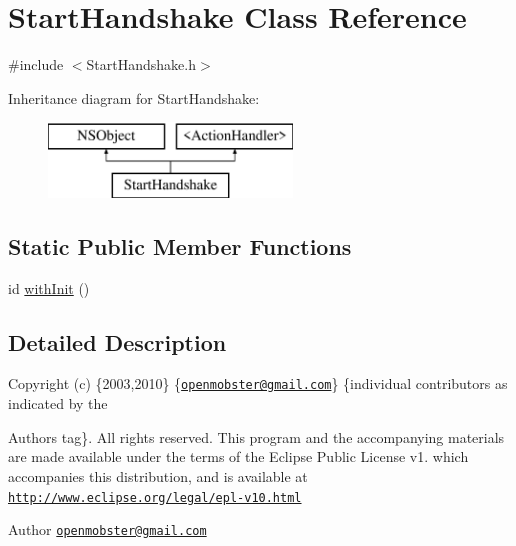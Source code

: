 \hypertarget{interface_start_handshake}{
\section{\-Start\-Handshake \-Class \-Reference}
\label{interface_start_handshake}
}


{\ttfamily \#include $<$\-Start\-Handshake.\-h$>$}

\-Inheritance diagram for \-Start\-Handshake\-:\begin{figure}[H]
\begin{center}
\leavevmode
\includegraphics[height=2.000000cm]{interface_start_handshake}
\end{center}
\end{figure}
\subsection*{\-Static \-Public \-Member \-Functions}
\begin{DoxyCompactItemize}
\item 
id \hyperlink{interface_start_handshake_aaef2088f24f747ba711f99364a2b1d2d}{with\-Init} ()
\end{DoxyCompactItemize}


\subsection{\-Detailed \-Description}
\-Copyright (c) \{2003,2010\} \{\href{mailto:openmobster@gmail.com}{\tt openmobster@gmail.\-com}\} \{individual contributors as indicated by the \begin{DoxyAuthor}{\-Authors}
tag\}. \-All rights reserved. \-This program and the accompanying materials are made available under the terms of the \-Eclipse \-Public \-License v1. which accompanies this distribution, and is available at \href{http://www.eclipse.org/legal/epl-v10.html}{\tt http\-://www.\-eclipse.\-org/legal/epl-\/v10.\-html}
\end{DoxyAuthor}
\begin{DoxyAuthor}{\-Author}
\href{mailto:openmobster@gmail.com}{\tt openmobster@gmail.\-com} 
\end{DoxyAuthor}



